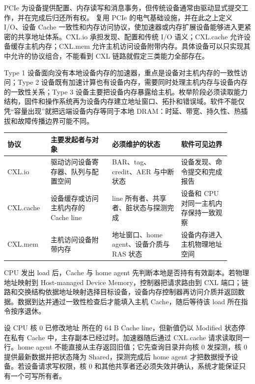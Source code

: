 PCIe 为设备提供配置、内存读写和消息事务，但传统设备通常由驱动显式提交工作，并在完成后归还所有权。 复用 PCIe 的电气基础设施，并在此之上定义 I/O、设备 Cache 一致性和内存访问协议，使加速器或内存扩展设备能够进入更紧密的共享地址体系。CXL.io 承担发现、配置和传统 I/O 语义；CXL.cache 允许设备缓存主机内存；CXL.mem 允许主机访问设备附带内存。具体设备可以只实现其中允许的协议组合，不能看到 CXL 链路就假定三类能力全部存在。\cite{cxl31}

Type 1 设备面向没有本地设备内存的加速器，重点是设备对主机内存的一致性访问；Type 2 设备既有加速计算也有设备内存，需要同时处理主机内存与设备内存的一致性关系；Type 3 设备主要把设备内存暴露给主机。枚举阶段必须读取能力结构，固件和操作系统再为设备内存建立地址窗口、拓扑和错误域。软件不能仅凭“容量出现”就把远端设备内存等同于本地 DRAM：时延、带宽、持久性、热插拔和故障传播边界可能不同。

\begin{longtable}{L{0.16\linewidth}L{0.25\linewidth}L{0.29\linewidth}L{0.20\linewidth}}
\toprule
协议 & 主要发起者与对象 & 必须维护的状态 & 软件可见边界 \\
\midrule
CXL.io & 驱动访问设备寄存器、队列与配置空间 & BAR、tag、credit、AER 与中断状态 & 设备发现、命令提交和完成报告 \\\tablerowrule
CXL.cache & 设备缓存或访问主机内存的 Cache line & line 所有者、共享者、脏状态与探测完成 & 设备和 CPU 对同一主机内存保持一致观察 \\\tablerowrule
CXL.mem & 主机访问设备附带内存 & 地址窗口、home agent、设备介质与 RAS 状态 & 设备内存进入主机物理地址空间 \\
\bottomrule
\end{longtable}

CPU 发出 load 后，Cache 与 home agent 先判断本地是否持有有效副本。若物理地址映射到 Host-managed Device Memory，控制器把请求路由到 CXL 端口；链路和交换结构依据地址映射选择目标设备，设备内存控制器再访问介质并返回数据。数据到达并通过一致性检查后才能填入主机 Cache，随后等待该 load 所在指令按序退休。


设 CPU 核 0 已修改地址  所在的 64 B Cache line，但新值仍以 Modified 状态停在私有 Cache 中，主存副本已经过时。加速器随后通过 CXL.cache 请求读取同一行。home agent 不能直接从主存返回旧值；它先查询目录并向核 0 发探测，核 0 提供最新数据并把状态降为 Shared，探测完成后 home agent 才把数据授予设备。若设备请求写权限，核 0 和其他共享者还必须失效并确认，系统才能保证只有一个可写所有者。

